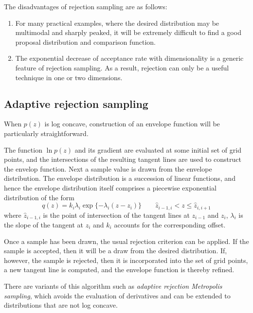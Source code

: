 \documentclass[a4paper]{book}
\newcommand{\imp}[1]{\textit{#1}}
\begin{document}
The disadvantages of rejection sampling are as follows:
\begin{enumerate}
	\item For many practical examples, where the desired distribution may be multimodal and sharply peaked, it will be extremely difficult to find a good proposal distribution and comparison function.
	\item The exponential decrease of acceptance rate with dimensionality is a generic feature of rejection sampling. As a result, rejection can only be a useful technique in one or two dimensions.
\end{enumerate}
\subsection{Adaptive rejection sampling}
When $p(z)$ is log concave, construction of an envelope function will be particularly straightforward.

The function $\ln p(z)$ and its gradient are evaluated at some initial set of grid points, and the intersections of the resulting tangent lines are used to construct the envelop function. Next a sample value is drawn from the envelope distribution. The envelope distribution is a succession of linear functions, and hence the envelope distribution itself comprises a piecewise exponential distribution of the form
\begin{equation}
	q(z) = k_i \lambda_i \exp \{ -\lambda_i (z - z_i) \} \qquad \hat{z}_{i-1,i} < z \leq \hat{z}_{i,i+1}
\end{equation}
where $\hat{z}_{i-1,i}$ is the point of intersection of the tangent lines at $z_{i-1}$ and $z_i$, $\lambda_i$ is the slope of the tangent at $z_i$ and $k_i$ accounts for the corresponding offset.

Once a sample has been drawn, the usual rejection criterion can be applied. If the sample is accepted, then it will be a draw from the desired distribution. If, however, the sample is rejected, then it is incorporated into the set of grid points, a new tangent line is computed, and the envelope function is thereby refined.

There are variants of this algorithm such as \imp{adaptive rejection Metropolis sampling}, which avoids the evaluation of derivatives and can be extended to distributions that are not log concave.
\end{document}
